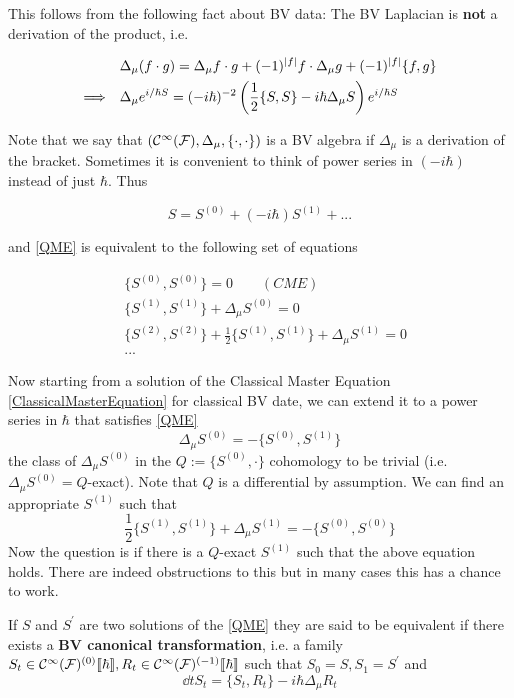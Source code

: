 This follows from the following fact about BV data: The BV Laplacian is \textbf{not} a derivation of the product, i.e.

\begin{align}
  &\Delta_\mu (f \cdot g) = \Delta_\mu f \cdot g + (-1)^{|f|} f \cdot \Delta_\mu g + (-1)^{|f|} \{f,g\} \\
  \Longrightarrow \quad &\Delta_\mu e^{i/\hbar S} = (-i \hbar)^{-2} \left( \frac{1}{2} \{S,S\} - i \hbar \Delta_\mu S \right) e^{i/\hbar S}
\end{align}

Note that we say that $(\mathcal{C}^{\infty}({\mathcal{F}}), \Delta_\mu, \{\cdot, \cdot\})$ is a BV algebra if $\Delta_\mu$ is a derivation of the bracket. Sometimes it is convenient to think of power series in $(-i \hbar)$ instead of just $\hbar$. Thus

\begin{equation}
  S = S^{(0)} + (-i \hbar) S^{(1)} + ...
\end{equation}

and \eqref{QME} is equivalent to the following set of equations

\begin{align*}
  &\{S^{(0)}, S^{(0)}\} = 0 \quad \quad (CME)\\
  &\{S^{(1)}, S^{(1)}\} + \Delta_\mu S^{(0)} = 0 \\
  &\{S^{(2)}, S^{(2)}\} + \frac{1}{2} \{S^{(1)}, S^{(1)}\} + \Delta_\mu S^{(1)} = 0 \\
  &...
\end{align*}

Now starting from a solution of the Classical Master Equation \eqref{ClassicalMasterEquation} for classical BV date, we can extend it to a power series in $\hbar$ that satisfies \eqref{QME}
\begin{equation}
  \Delta_\mu S^{(0)} = - \{S^{(0)},S^{(1)}\}
\end{equation}
the class of $\Delta_\mu S^{(0)}$ in the $Q := \{S^{(0)}, \cdot\}$ cohomology to be trivial (i.e. $\Delta_\mu S^{(0)} = Q$-exact). Note that $Q$ is a differential by assumption. We can find an appropriate $S^{(1)}$ such that
\begin{equation}
  \frac{1}{2} \{S^{(1)}, S^{(1)}\} + \Delta_\mu S^{(1)} = - \{S^{(0)}, S^{(0)}\}
\end{equation}
Now the question is if there is a $Q$-exact $S^{(1)}$ such that the above equation holds. There are indeed obstructions to this but in many cases this has a chance to work.

\begin{definition}
  If $S$ and $S^\prime$ are two solutions of the \eqref{QME} they are said to be equivalent if there exists a \textbf{BV canonical transformation}, i.e. a family $S_t \in \mathcal{C}^{\infty}({\mathcal{F}})^{(0)}\llbracket \hbar \rrbracket, R_t \in \mathcal{C}^{\infty}({\mathcal{F}})^{(-1)}\llbracket \hbar \rrbracket$ such that $S_0 = S, S_1 = S^\prime$ and
  \begin{equation}\tag{$\blacksquare$}\label{BVCanonical}
    \dd{}{t} S_t = \{S_t, R_t\} - i \hbar \Delta_\mu R_t
  \end{equation}
\end{definition}

